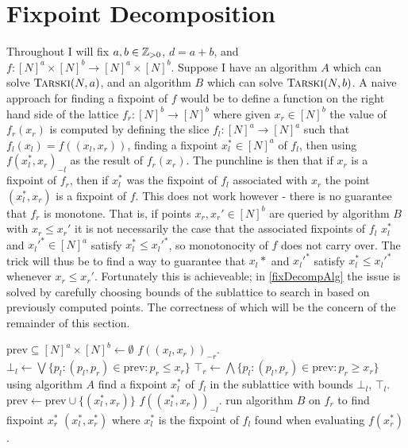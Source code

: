 \section{Fixpoint Decomposition} \label{fixDecompChapter}
Throughout I will fix $a, b \in \mathbb{Z}_{> 0}$,
$d = a + b$, and $f : [N]^a \times [N]^b \to [N]^a \times [N]^b$.
Suppose I have an algorithm $A$ which can solve $\textsc{Tarski}(N, a)$,
and an algorithm $B$ which can solve $\textsc{Tarski}(N, b)$. A naive approach 
for finding a fixpoint of $f$ would be to define a
function on the right hand side of the lattice
$f_r : [N]^b \to [N]^b$ where given $x_r \in [N]^b$ the value of 
$f_r(x_r)$
is computed by defining the slice $f_l : [N]^a \to [N]^a$
such that $f_l(x_l) = f((x_l, x_r))$, finding a fixpoint $x_l^* \in [N]^a$
of $f_l$, then using $f(x_l^*, x_r)_{-l}$ as the result of $f_r(x_r)$.
The punchline is then that if $x_r$ is a fixpoint of $f_r$, then if
$x_l^*$ was the fixpoint of $f_l$ associated with $x_r$ the point
$(x_l^*, x_r)$ is a fixpoint of $f$. This does not work however -
there is no guarantee that $f_r$ is monotone. That is,
if points $x_r, x_r' \in [N]^b$ are queried by algorithm $B$
with $x_r \leq x_r'$ it is not necessarily the case that the associated
fixpoints of $f_l$ $x_l^*$ and $x_l'^* \in [N]^a$ satisfy $x_l^* \leq x_l'^*$, so
monotonocity of $f$ does not carry over. The trick will thus be
to find a way to guarantee that $x_l*$ and $x_l'^*$ satisfy 
$x_l^* \leq x_l'^*$ whenever $x_r \leq x_r'$. Fortunately
this is achieveable; in \cref{fixDecompAlg} the issue is solved
by carefully choosing bounds of the sublattice to search in based
on previously computed points. The correctness of which will be
the concern of the remainder of this section.

\begin{algorithm}[h]
  \caption{\citep{fasterTarski}}\label{fixDecompAlg}
  \begin{algorithmic}[1]
    \State $\text{prev} \subseteq [N]^a \times [N]^b \gets \emptyset$
        \Return $f((x_l, x_r))_{-r}$.
      \EndProcedure
      \State $\bot_l \gets \bigvee\{p_l : (p_l, p_r) \in \text{prev} : p_r \leq x_r \}$
      \State $\top_r \gets \bigwedge\{p_l : (p_l, p_r) \in \text{prev} : p_r \geq x_r \}$
      \State using algorithm $A$ find a fixpoint $x_l^*$ of $f_l$ in the sublattice with bounds
      $\bot_l$, $\top_l$.
      \State $\text{prev} \gets \text{prev} \cup \{(x_l^*, x_r)\}$
      \State \Return $f((x_l^*, x_r))_{-l}$.
    \EndProcedure
    \State run algorithm $B$ on $f_r$ to find fixpoint $x_r^*$
    \State \Return $(x_l^*, x_r^*)$ where $x_l^*$ is the fixpoint of $f_l$ 
    found when evaluating $f(x_r^*)$.
  \EndProcedure
  \end{algorithmic}
\end{algorithm}

